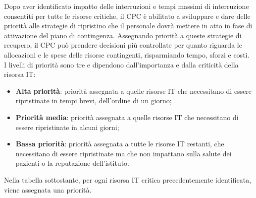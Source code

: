 \documentclass[12pt, a4paper, titlepage]{report}
\begin{document}
		Dopo aver identificato impatto delle interruzioni e tempi massimi di interruzione consentiti per tutte le risorse critiche, il CPC è abilitato a sviluppare e dare delle priorità alle strategie di ripristino che il personale dovrà mettere in atto in fase di attivazione del piano di contingenza. Assegnando priorità a queste strategie di recupero, il CPC può prendere decisioni più controllate per quanto riguarda le allocazioni e le spese delle risorse contingenti, risparmiando tempo, sforzi e costi. I livelli di priorità sono tre e dipendono dall'importanza e dalla criticità della risorsa IT:
		\begin{itemize}
			\item \textbf{Alta priorità}: priorità assegnata a quelle risorse IT che necessitano di essere ripristinate in tempi brevi, dell'ordine di un giorno;
			\item \textbf{Priorità media}: priorità assegnata a quelle risorse IT che necessitano di essere ripristinate in alcuni giorni;
			\item \textbf{Bassa priorità}: priorità assegnata a tutte le risorse IT restanti, che necessitano di essere ripristinate ma che non impattano sulla salute dei pazienti o la reputazione dell'istituto.
		\end{itemize}		
		Nella tabella sottostante, per ogni risorsa IT critica precedentemente identificata, viene assegnata una priorità.
		
\end{document}
